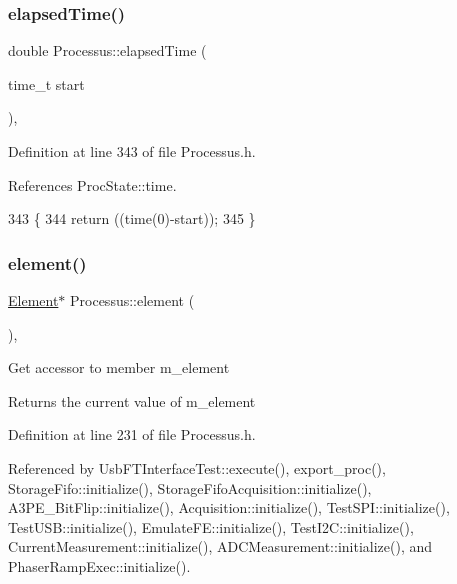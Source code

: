\subsubsection{\texorpdfstring{elapsed\+Time()}{elapsedTime()}\hspace{0.1cm}{\footnotesize\ttfamily [2/2]}}
{\footnotesize\ttfamily double Processus\+::elapsed\+Time (\begin{DoxyParamCaption}\item[{time\+\_\+t}]{start }\end{DoxyParamCaption})\hspace{0.3cm}{\ttfamily [inline]}, {\ttfamily [inherited]}}



Definition at line 343 of file Processus.\+h.



References Proc\+State\+::time.


\begin{DoxyCode}
343                                    \{
344     \textcolor{keywordflow}{return} ((time(0)-start));
345   \}
\end{DoxyCode}
\mbox{\label{classProcessus_a6fe155527431a7190b7d44d600b9608d}} 
\subsubsection{\texorpdfstring{element()}{element()}}
{\footnotesize\ttfamily \hyperlink{classElement}{Element}$\ast$ Processus\+::element (\begin{DoxyParamCaption}{ }\end{DoxyParamCaption})\hspace{0.3cm}{\ttfamily [inline]}, {\ttfamily [inherited]}}

Get accessor to member m\+\_\+element \begin{DoxyReturn}{Returns}
the current value of m\+\_\+element 
\end{DoxyReturn}


Definition at line 231 of file Processus.\+h.



Referenced by Usb\+F\+T\+Interface\+Test\+::execute(), export\+\_\+proc(), Storage\+Fifo\+::initialize(), Storage\+Fifo\+Acquisition\+::initialize(), A3\+P\+E\+\_\+\+Bit\+Flip\+::initialize(), Acquisition\+::initialize(), Test\+S\+P\+I\+::initialize(), Test\+U\+S\+B\+::initialize(), Emulate\+F\+E\+::initialize(), Test\+I2\+C\+::initialize(), Current\+Measurement\+::initialize(), A\+D\+C\+Measurement\+::initialize(), and Phaser\+Ramp\+Exec\+::initialize().


